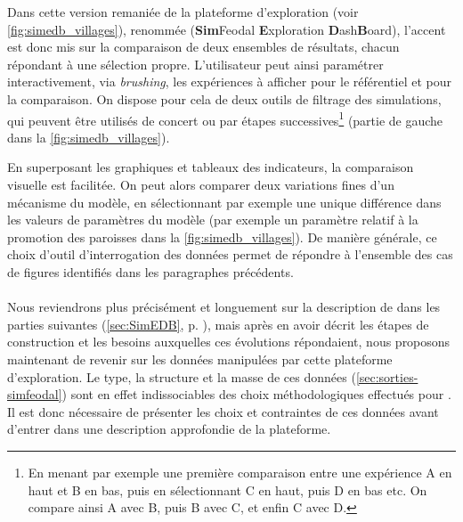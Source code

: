 Dans cette version remaniée de la plateforme d'exploration (voir \cref{fig:simedb_villages}), renommée \simedb{}\label{par:introduction-nom-simedb} (\textbf{Sim}Feodal \textbf{E}xploration \textbf{D}ash\textbf{B}oard), l'accent est donc mis sur la comparaison de deux ensembles de résultats, chacun répondant à une sélection propre.
L'utilisateur peut ainsi \og paramétrer\fg{} interactivement, via \textit{brushing}, les expériences à afficher pour le référentiel et pour la comparaison.
On dispose pour cela de deux outils de filtrage des simulations, qui peuvent être utilisés de concert ou par étapes successives\footnote{
	En menant par exemple une première comparaison entre une expérience \og A\fg{} en haut et \og B\fg{} en bas, puis en sélectionnant \og C\fg{} en haut, puis \og D\fg{} en bas etc.
	On compare ainsi A avec B, puis B avec C, et enfin C avec D.
} (partie de gauche dans la \cref{fig:simedb_villages}).

En superposant les graphiques et tableaux des indicateurs, la comparaison visuelle est facilitée.
On peut alors comparer deux variations fines d'un mécanisme du modèle, en sélectionnant par exemple une unique différence dans les valeurs de paramètres du modèle (par exemple un paramètre relatif à la promotion des paroisses dans la \cref{fig:simedb_villages}).
De manière générale, ce choix d'outil d'interrogation des données permet de répondre à l'ensemble des cas de figures identifiés dans les paragraphes précédents.

\paragraph[Conclusion intermédiaire]{}
Nous reviendrons plus précisément et longuement sur la description de \simedb{} dans les parties suivantes (\cref{sec:SimEDB}, p. \pageref{sec:SimEDB}), mais après en avoir décrit les étapes de construction et les besoins auxquelles ces évolutions répondaient, nous proposons maintenant de revenir sur les données manipulées par cette plateforme d'exploration.
Le type, la structure et la masse de ces données (\cref{sec:sorties-simfeodal}) sont en effet indissociables des choix méthodologiques effectués pour \simedb{}.
Il est donc nécessaire de présenter les choix et contraintes de ces données avant d'entrer dans une description approfondie de la plateforme.

